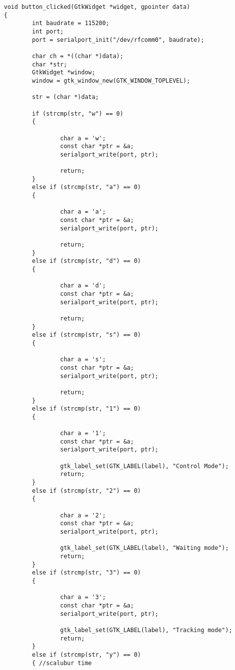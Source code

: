 \begin{lstlisting}
void button_clicked(GtkWidget *widget, gpointer data)
{
        int baudrate = 115200;
        int port;
        port = serialport_init("/dev/rfcomm0", baudrate);

        char ch = *((char *)data);
        char *str;
        GtkWidget *window;
        window = gtk_window_new(GTK_WINDOW_TOPLEVEL);

        str = (char *)data;

        if (strcmp(str, "w") == 0)
        {

                char a = 'w';
                const char *ptr = &a;
                serialport_write(port, ptr);

                return;
        }
        else if (strcmp(str, "a") == 0)
        {

                char a = 'a';
                const char *ptr = &a;
                serialport_write(port, ptr);

                return;
        }
        else if (strcmp(str, "d") == 0)
        {

                char a = 'd';
                const char *ptr = &a;
                serialport_write(port, ptr);

                return;
        }
        else if (strcmp(str, "s") == 0)
        {

                char a = 's';
                const char *ptr = &a;
                serialport_write(port, ptr);

                return;
        }
        else if (strcmp(str, "1") == 0)
        {

                char a = '1';
                const char *ptr = &a;
                serialport_write(port, ptr);

                gtk_label_set(GTK_LABEL(label), "Control Mode");
                return;
        }
        else if (strcmp(str, "2") == 0)
        {

                char a = '2';
                const char *ptr = &a;
                serialport_write(port, ptr);

                gtk_label_set(GTK_LABEL(label), "Waiting mode");
                return;
        }
        else if (strcmp(str, "3") == 0)
        {

                char a = '3';
                const char *ptr = &a;
                serialport_write(port, ptr);

                gtk_label_set(GTK_LABEL(label), "Tracking mode");
                return;
        }
        else if (strcmp(str, "y") == 0)
        { //scalubur time


\end{lstlisting}
